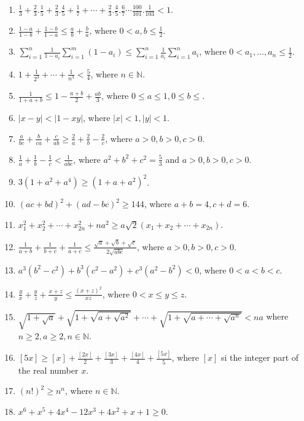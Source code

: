 \begin{enumerate}
\item $\frac{1}{3} + \frac{2}{3}.\frac{1}{5} + \frac{2}{3}.\frac{4}{5} + \frac{1}{7} + \cdots +
  \frac{2}{3}.\frac{4}{5}.\frac{6}{7}\cdots \frac{100}{101}.\frac{1}{103} < 1$.
\item $\frac{1 - a}{1 - b} + \frac{1 - b}{1 - a}\leq \frac{a}{b} + \frac{b}{a}$, where $0 < a, b\leq \frac{1}{2}$.
\item $\displaystyle\sum_{i=1}^n\frac{1}{1 - a_i}\sum_{i=1}^m(1 - a_i)\leq \sum_{i=1}^n\frac{1}{a_i}\sum_{i=1}^na_i$, where $0 < a_1, \ldots,
  a_n\leq \frac{1}{2}$.
\item $1 + \frac{1}{2^3} + \cdots + \frac{1}{n^3} < \frac{5}{4}$, where $n\in\mathbb{N}$.
\item $\frac{1}{1 + a + b}\leq 1 - \frac{a + b}{2} + \frac{ab}{3}$, where $0\leq a\leq 1, 0\leq b\leq$.
\item $|x - y| < |1 - xy|$, where $|x| < 1, |y| < 1$.
\item $\frac{a}{bc} + \frac{b}{ca} + \frac{c}{ab}\geq \frac{2}{a} + \frac{2}{b} - \frac{2}{c}$, where $a > 0, b > 0, c > 0$.
\item $\frac{1}{a} + \frac{1}{b} - \frac{1}{c} < \frac{1}{abc}$, where $a^2 + b^2 + c^2 = \frac{5}{3}$ and $a > 0, b > 0, c > 0$.
\item $3(1 + a^2 + a^4)\geq (1 + a + a^2)^2$.
\item $(ac + bd)^2 + (ad - bc)^2\geq 144$, where $a + b = 4, c + d = 6$.
\item $x_1^2 + x_2^2 + \cdots + x_{2n}^2 + na^2 \geq a\sqrt{2}(x_1 + x_2 + \cdots + x_{2n})$.
\item $\frac{1}{a + b} + \frac{1}{b + c} + \frac{1}{a + c}\leq \frac{\sqrt{a} + \sqrt{b} + \sqrt{c}}{2\sqrt{abc}}$, where $a > 0, b
  > 0, c > 0$.
\item $a^3(b^2 - c^2) + b^3(c^2 - a^2) + c^3(a^2 - b^2) < 0$, where $0 < a < b < c$.
\item $\frac{y}{x} + \frac{y}{z} + \frac{x + z}{y}\leq \frac{(x + z)^2}{xz}$, where $0< x\leq y\leq z$.
\item $\sqrt{1 + \sqrt{a}} + \sqrt{1 + \sqrt{a + \sqrt{a^2}}} + \cdots + \sqrt{1 + \sqrt{a + \cdots + \sqrt{a^n}}} < na$ where $n
  \geq 2, a\geq 2, n\in\mathbb{N}$.
\item $[5x]\geq [x] + \frac{[2x]}{2} + \frac{[3x]}{3} + \frac{[4x]}{4} + \frac{[5x]}{5}$, where $[x]$ si the integer part of the
  real number $x$.
\item $(n!)^2 \geq n^n$, where $n\in\mathbb{N}$.
\item $x^6 + x^5 + 4x^4 - 12x^3 + 4x^2 + x + 1\geq 0$.

\end{enumerate}
